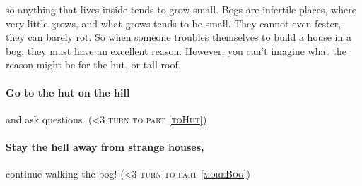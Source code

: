 \documentclass[10pt,twoside]{book}
\newcommand*\goTo[1]{({\scshape\ifnum\value{list}<3 turn to \fi part \vref{#1}})}
\begin{document}
so anything that lives inside tends to grow small.
Bogs are infertile places, where very little grows, and what grows tends to be small.
They cannot even fester, they can barely rot.
So when someone troubles themselves to build a house in a bog, they must have an excellent reason.
However, you can't imagine what the reason might be for the hut, or tall roof.

\paragraph{Go to the hut on the hill}
and ask questions.
\goTo{toHut}

\paragraph{Stay the hell away from strange houses,}
continue walking the bog!
\goTo{moreBog}
\end{document}

